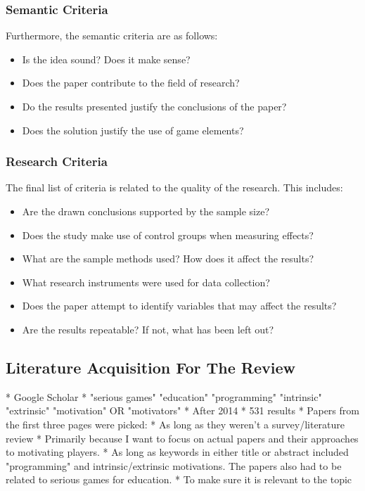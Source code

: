 \subsubsection{Semantic Criteria}
Furthermore, the semantic criteria are as follows: 
\begin{itemize}
    \item Is the idea sound? Does it make sense?
    \item Does the paper contribute to the field of research?
    \item Do the results presented justify the conclusions of the paper?
    \item Does the solution justify the use of game elements?
\end{itemize}

\subsubsection{Research Criteria}
The final list of criteria is related to the quality of the research. This includes: 
\begin{itemize}
    \item Are the drawn conclusions supported by the sample size?
    \item Does the study make use of control groups when measuring effects?
    \item What are the sample methods used? How does it affect the results?
    \item What research instruments were used for data collection?
    \item Does the paper attempt to identify variables that may affect the results?
    \item Are the results repeatable? If not, what has been left out?
\end{itemize}

\subsection{Literature Acquisition For The Review}
    * Google Scholar
        * "serious games" "education" "programming" "intrinsic" "extrinsic" "motivation" OR "motivators"
        * After 2014
        * 531 results
        * Papers from the first three pages were picked:
            * As long as they weren't a survey/literature review
                * Primarily because I want to focus on actual papers and their approaches to motivating players. 
            * As long as keywords in either title or abstract included "programming" and intrinsic/extrinsic motivations. The papers also had to be related to serious games for education. 
                * To make sure it is relevant to the topic
        
